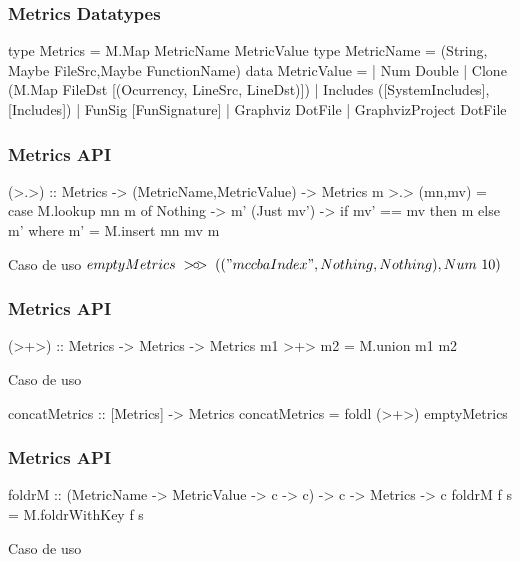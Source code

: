 \documentclass{beamer}
\begin{document}
\begin{frame}[fragile] \frametitle{Metrics Datatypes}
\begin{haskellcode}
type Metrics = M.Map MetricName MetricValue
type MetricName = (String, Maybe FileSrc,Maybe FunctionName)
data MetricValue =
    | Num Double
    | Clone (M.Map FileDst [(Ocurrency, LineSrc, LineDst)])
    | Includes ([SystemIncludes],[Includes])
    | FunSig [FunSignature]
    | Graphviz DotFile
    | GraphvizProject DotFile																				 
\end{haskellcode}
\end{frame}

\newcommand{\metricsins}{\mathbin{>\mkern-7mu\circ\mkern-9mu>}}
\newcommand{\metricscat}{\mathbin{>\mkern-7mu+\mkern-11mu>}}
\begin{frame}[fragile] \frametitle{Metrics API}
\begin{haskellcode}
(>.>) :: Metrics -> (MetricName,MetricValue) -> Metrics
m >.> (mn,mv) = 
    case M.lookup mn m of
        Nothing    -> m'
        (Just mv') -> if mv' == mv then m else m'
    where m' = M.insert mn mv m
\end{haskellcode}
\begin{block}{Caso de uso}
$emptyMetrics~\metricsins~(("mccbaIndex",Nothing,Nothing), Num~10)$
\end{block}
\end{frame}

\begin{frame}[fragile] \frametitle{Metrics API}
\begin{haskellcode}
(>+>) :: Metrics -> Metrics -> Metrics
m1 >+> m2 = M.union m1 m2
\end{haskellcode}
\begin{block}{Caso de uso}
\begin{haskellcode}
concatMetrics :: [Metrics] -> Metrics
concatMetrics = foldl (>+>) emptyMetrics
\end{haskellcode}
\end{block}
\end{frame}

\begin{frame}[fragile] \frametitle{Metrics API}
\begin{haskellcode}
foldrM :: (MetricName -> MetricValue -> c -> c) -> c -> Metrics -> c
foldrM f s = M.foldrWithKey f s
\end{haskellcode}
\begin{block}{Caso de uso}
\end{block}
\end{frame}
\end{document}
